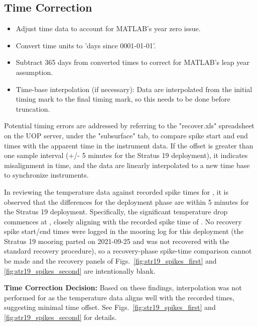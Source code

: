 \subsection{Time Correction}
\begin{itemize}
\item Adjust time data to account for MATLAB's year zero issue.
\item Convert time units to 'days since 0001-01-01'.
\item Subtract 365 days from converted times to correct for MATLAB's leap year assumption.
\item Time-base interpolation (if necessary): Data are interpolated from the initial timing mark to the final timing mark, 
so this needs to be done before truncation.
\end{itemize}

Potential timing errors are addressed by referring to the "recover.xls" spreadsheet on the UOP server, 
under the "subsurface" tab, to compare spike start and end times with the apparent time in the instrument data. 
If the offset is greater than one sample interval (+/- 5 minutes for the Stratus 19 deployment),
it indicates misalignment in time, and the data are linearly interpolated to a new time base to synchronize instruments.


In reviewing the temperature data against recorded spike times for \displayprojectname{} \casenumber{}, it is observed
that the differences for the deployment phase are within 5 minutes for the Stratus 19 deployment. Specifically, the significant temperature drop commences at \DeploymentSpike{}, closely aligning with
the recorded spike time of \DeploymentRecordedSpike{}. 
No recovery spike start/end times were logged in the mooring log for this deployment (the Stratus 19 mooring parted on 2021-09-25 and was not recovered with the standard recovery procedure), so a recovery-phase spike-time comparison cannot be made and the recovery panels of Figs.~\ref{fig:str19_spikes_first} and \ref{fig:str19_spikes_second} are intentionally blank.

\textbf{Time Correction Decision:} Based on these findings, 
interpolation was not performed for \displayprojectname{} \casenumber{} as the temperature data 
aligns well with the recorded times, suggesting minimal time offset. 
See Figs.~\ref{fig:str19_spikes_first} and \ref{fig:str19_spikes_second} for details.


